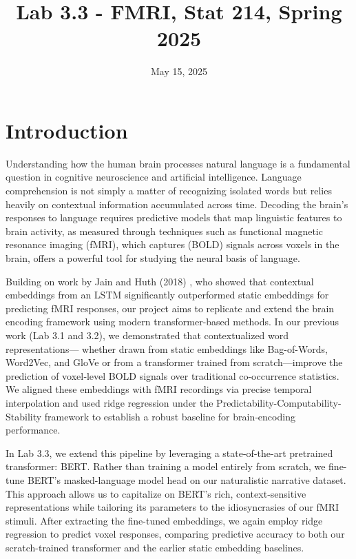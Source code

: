 \documentclass{article}
\title{Lab 3.3 - FMRI, Stat 214, Spring 2025}
\date{May 15, 2025}
\begin{document}
\maketitle

\section{Introduction}

Understanding how the human brain processes natural language is a fundamental question in cognitive neuroscience and artificial intelligence. Language comprehension is not simply a matter of recognizing isolated words but relies heavily on contextual information accumulated across time. Decoding the brain’s responses to language requires predictive models that map linguistic features to brain activity, as measured through techniques such as functional magnetic resonance imaging (fMRI), which captures  (BOLD) signals across voxels in the brain, offers a powerful tool for studying the neural basis of language.

Building on work by Jain and Huth (2018) \cite{jain2018}, who showed that contextual embeddings from an LSTM significantly outperformed static embeddings for predicting fMRI responses, our project aims to replicate and extend the brain encoding framework using modern transformer-based methods. In our previous work (Lab 3.1 and 3.2), we demonstrated that contextualized word representations— whether drawn from static embeddings like Bag-of-Words, Word2Vec, and GloVe or from a transformer trained from scratch—improve the prediction of voxel‐level BOLD signals over traditional co-occurrence statistics. We aligned these embeddings with fMRI recordings via precise temporal interpolation and used ridge regression under the Predictability-Computability-Stability framework to establish a robust baseline for brain‐encoding performance.

In Lab 3.3, we extend this pipeline by leveraging a state-of-the-art pretrained transformer: BERT. Rather than training a model entirely from scratch, we fine-tune BERT’s masked-language model head on our naturalistic narrative dataset. This approach allows us to capitalize on BERT’s rich, context‐sensitive representations while tailoring its parameters to the idiosyncrasies of our fMRI stimuli. After extracting the fine-tuned embeddings, we again employ ridge regression to predict voxel responses, comparing predictive accuracy to both our scratch-trained transformer and the earlier static embedding baselines.
\end{document}
